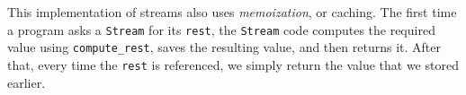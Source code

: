This implementation of streams also uses \emph{memoization}, or caching.
The first time a program asks a \lstinline$Stream$ for its \lstinline$rest$,
the \lstinline$Stream$ code computes the required value using
\lstinline$compute_rest$, saves the resulting value, and then returns it.
After that, every time the \lstinline$rest$ is referenced, we simply return
the value that we stored earlier.

